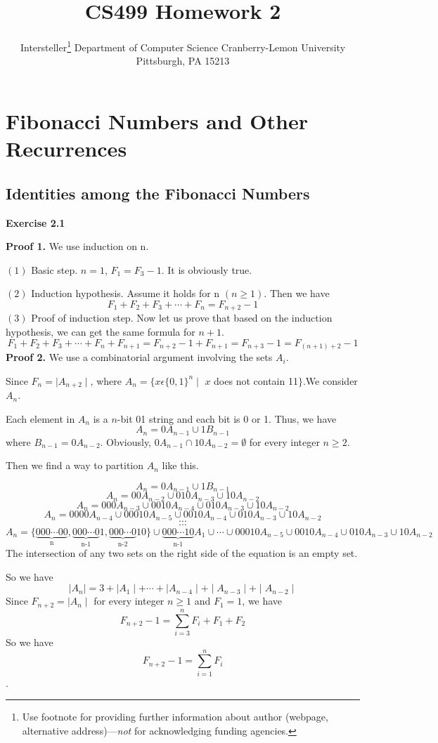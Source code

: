 \documentclass{article} %
\title{CS499 Homework 2}
\author{
	Intersteller\thanks{ Use footnote for providing further information
		about author (webpage, alternative address)---\emph{not} for acknowledging
		funding agencies.}
	Department of Computer Science
	Cranberry-Lemon University
	Pittsburgh, PA 15213
}
\begin{document}
	
	
	\maketitle
	
	\section{Fibonacci Numbers and Other Recurrences}
	\subsection{Identities among the Fibonacci Numbers}
	\textbf{Exercise 2.1}\par
	\textbf{Proof 1.} We use induction on n.\par
    $(1)$ Basic step. $n=1$, $F_1=F_3-1$. It is obviously true.\par
    $(2)$ Induction hypothesis. Assume it holds for n $(n \ge 1)$. Then we have
    $$
    F_1+F_2+F_3+\cdots+F_n=F_{n+2}-1
    $$
    $(3)$ Proof of induction step. Now let us prove that based on the induction hypothesis, we can get the same formula for $n+1$.
    $$
    F_1+F_2+F_3+\cdots+F_n+F_{n+1}=F_{n+2}-1+F_{n+1}=F_{n+3}-1=F_{(n+1)+2}-1
    $$
    \textbf{Proof 2.} We use a combinatorial argument involving the sets $A_i$.\par
    Since $F_{n}=\mid A_{n+2} \mid$, where $A_{n} = \{x\epsilon{\{0,1\}}^{n}\mid$ $x$ does not contain 11$\}$.We consider $A_{n}$.\par
    Each element in $A_{n}$ is a  $n$-bit 01 string and each bit is 0 or 1. Thus, we have
    $$
	A_{n}=0A_{n-1}\cup1B_{n-1}
	$$
    where $B_{n-1}=0A_{n-2}$. Obviously, $0A_{n-1}\cap10A_{n-2}=\emptyset$ for every integer $n \ge 2$.\par
	Then we find a way to partition $A_{n}$ like this.\par
	$$A_{n}=0A_{n-1}\cup1B_{n-1}$$
	$$A_{n}=00A_{n-2}\cup010A_{n-3}\cup10A_{n-2}$$
	$$A_{n}=000A_{n-3}\cup0010A_{n-4}\cup010A_{n-3}\cup10A_{n-2}$$
    $$A_{n}=0000A_{n-4}\cup00010A_{n-5}\cup0010A_{n-4}\cup010A_{n-3}\cup10A_{n-2}$$
	$$\cdots$$
	$$\cdots$$
    $$A_{n}=\{\underbrace{000\cdots00}_{\text{n}},\underbrace{000\cdots0}_{\text{n-1}}1,\underbrace{000\cdots0}_{\text{n-2}}10\}\cup\underbrace{000\cdots10}_{\text{n-1}}A_1\cup\cdots\cup00010A_{n-5}\cup0010A_{n-4}\cup010A_{n-3}\cup10A_{n-2}$$
    The intersection of any two sets on the right side of the equation is an empty set.\par
    So we have
    $$
    \mid A_{n} \mid=3+\mid A_1 \mid+\cdots+\mid A_{n-4} \mid+\mid A_{n-3} \mid+\mid A_{n-2}\mid
    $$
	Since $F_{n+2}=\mid A_{n} \mid$ for every integer $n\ge1$ and $F_1=1$, we have
	$$
    F_{n+2}-1=\sum_{i=3}^{n}F_i+F_1+F_2
	$$
    So we have
    $$
    F_{n+2}-1=\sum_{i=1}^{n}F_i
    $$.
\end{document}
